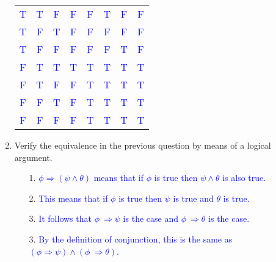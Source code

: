 \documentclass[13.5pt]{article}
\begin{document}
\begin{enumerate}
\begin{center}
\begin{tabular}{c c c c c c c c}
 \textcolor{blue}{T} & \textcolor{blue}{T} & \textcolor{blue}{F} & \textcolor{blue}{F} & \textcolor{blue}{F} & \textcolor{blue}{T} & \textcolor{blue}{F} & \textcolor{blue}{F}\\ 
 
 \textcolor{blue}{T} & \textcolor{blue}{F} & \textcolor{blue}{T} & \textcolor{blue}{F} & \textcolor{blue}{F} & \textcolor{blue}{F} & \textcolor{blue}{F} & \textcolor{blue}{F}\\
 
 \textcolor{blue}{T} & \textcolor{blue}{F} & \textcolor{blue}{F} & \textcolor{blue}{F} & \textcolor{blue}{F} & \textcolor{blue}{F} & \textcolor{blue}{T} & \textcolor{blue}{F}\\ 
 
  \textcolor{blue}{F} & \textcolor{blue}{T} & \textcolor{blue}{T} & \textcolor{blue}{T} & \textcolor{blue}{T} & \textcolor{blue}{T} & \textcolor{blue}{T} & \textcolor{blue}{T}\\
  
 \textcolor{blue}{F} & \textcolor{blue}{T} & \textcolor{blue}{F} & \textcolor{blue}{F} & \textcolor{blue}{T} & \textcolor{blue}{T} & \textcolor{blue}{T} & \textcolor{blue}{T}\\ 
 
 \textcolor{blue}{F} & \textcolor{blue}{F} & \textcolor{blue}{T} & \textcolor{blue}{F} & \textcolor{blue}{T} & \textcolor{blue}{T} & \textcolor{blue}{T} & \textcolor{blue}{T}\\ 
 
 \textcolor{blue}{F} & \textcolor{blue}{F} & \textcolor{blue}{F} & \textcolor{blue}{F} & \textcolor{blue}{T} & \textcolor{blue}{T} & \textcolor{blue}{T} & \textcolor{blue}{T}\\ 
 
 
\end{tabular}
\end{center}

\item{Verify the equivalence in the previous question by means of a logical argument.}

\begin{enumerate}
\setlength{\itemindent}{.1in} 
\item[1.]  \textcolor{blue} {\(\phi \Rightarrow (\psi \wedge \theta)\) means that if \(\phi\) is true then \(\psi \wedge \theta\) is also true.}
\item[2.]  \textcolor{blue} {This means that if \(\phi\) is true then \(\psi\) is true and \(\theta\) is true.}
\item[3.]  \textcolor{blue} {It follows that \(\phi\ \Rightarrow \psi\) is the case and \(\phi\ \Rightarrow \theta\) is the case.}
\item[3.]  \textcolor{blue} {By the definition of conjunction, this is the same as \((\phi \Rightarrow \psi) \wedge (\phi\ \Rightarrow \theta)\).}
\end{enumerate}


\end{enumerate}
\end{document}
